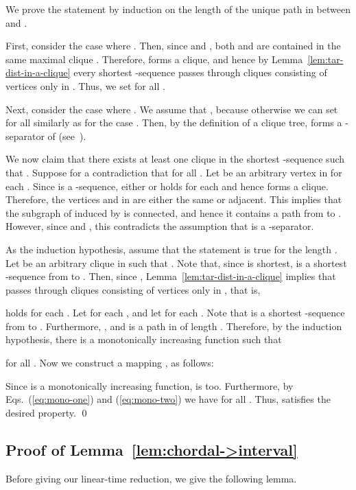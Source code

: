 \documentclass{llncs}
\newcounter{one}
\newcounter{two}
\begin{document}
We prove the statement by induction on the length  of the unique path  in  between  and .

	First, consider the case where .
	Then, since  and , both  and  are contained in the same maximal clique .
	Therefore,  forms a clique, and hence by Lemma~\ref{lem:tar-dist-in-a-clique} every shortest -sequence passes through cliques consisting of vertices only in .
	Thus, we set  for all .
\medskip

	Next, consider the case where . 
	We assume that , because otherwise we can set  for all  similarly as for the case .
	Then, by the definition of a clique tree,  forms a -separator of  (see~\cite[Lemma 4.2]{BP93chordal}).

	We now claim that there exists at least one clique  in the shortest -sequence  such that .
	Suppose for a contradiction that  for all .
	Let  be an arbitrary vertex in  for each .
	Since  is a -sequence, either  or  holds for each  and hence  forms a clique.
	Therefore, the vertices  and  in  are either the same or adjacent.
	This implies that the subgraph of  induced by  is connected, and hence it contains a path from  to .
	However, since  and , this contradicts the assumption that  is a -separator.
 
	As the induction hypothesis, assume that the statement is true for the length .
	Let  be an arbitrary clique in  such that . 
	Note that, since  is shortest,  is a shortest -sequence from  to . 
	Then, since , Lemma~\ref{lem:tar-dist-in-a-clique} implies that  passes through cliques consisting of vertices only in , that is,
	
holds for each .
	Let  for each , and let  for each .
	Note that  is a shortest -sequence from  to . 
	Furthermore, ,  and   is a path in  of length .
	Therefore, by the induction hypothesis, there is a monotonically increasing function  such that 
	
for all .
	Now we construct a mapping , as follows:
	
	Since  is a monotonically increasing function,  is too. 
	Furthermore, by Eqs.~(\ref{eq:mono-one}) and (\ref{eq:mono-two}) we have  for all .
	Thus,  satisfies the desired property.
	\qed






	\subsection{Proof of Lemma~\ref{lem:chordal->interval}}
	Before giving our linear-time reduction, we give the following lemma.
\end{document}
